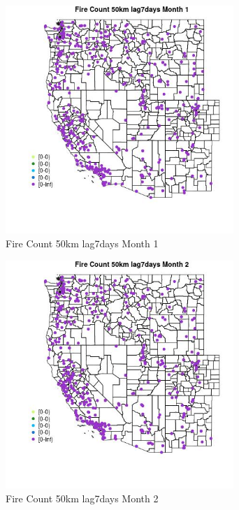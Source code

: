 \begin{figure} 
\centering  
\includegraphics[width=0.77\textwidth]{Code_Outputs/Report_ML_input_PM25_Step4_part_e_de_duplicated_aves_compiled_2019-05-18wNAs_MapObsMo1Fire_Count_50km_lag7days.jpg} 
\caption{\label{fig:Report_ML_input_PM25_Step4_part_e_de_duplicated_aves_compiled_2019-05-18wNAsMapObsMo1Fire_Count_50km_lag7days}Fire Count 50km lag7days Month 1} 
\end{figure} 
 

\begin{figure} 
\centering  
\includegraphics[width=0.77\textwidth]{Code_Outputs/Report_ML_input_PM25_Step4_part_e_de_duplicated_aves_compiled_2019-05-18wNAs_MapObsMo2Fire_Count_50km_lag7days.jpg} 
\caption{\label{fig:Report_ML_input_PM25_Step4_part_e_de_duplicated_aves_compiled_2019-05-18wNAsMapObsMo2Fire_Count_50km_lag7days}Fire Count 50km lag7days Month 2} 
\end{figure} 
 

